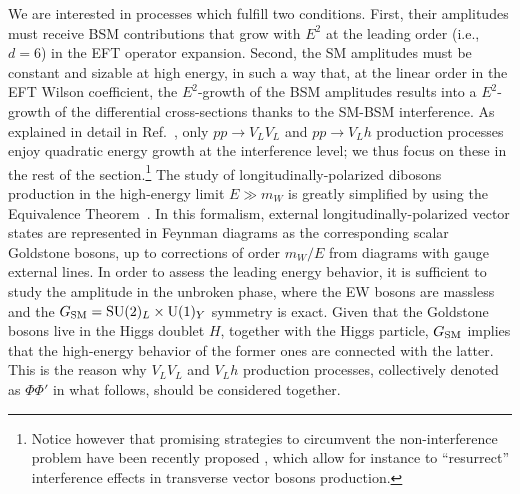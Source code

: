 \documentclass[../report.tex]{subfiles}
\begin{document}
We are interested in processes which fulfill two conditions. First, their amplitudes must receive BSM contributions that grow with $E^2$ at the leading order (i.e., $d=6$) in the EFT operator expansion. Second, the  SM amplitudes must be constant and sizable
at high energy, in such a way that, at the linear order in the EFT Wilson coefficient,  the $E^2$-growth of the BSM amplitudes
results into a $E^2$-growth of the differential cross-sections thanks to the SM-BSM interference. 
As explained in detail in Ref.~\cite{Franceschini:2017ab}, only $pp \to V_LV_L $ and $pp \to V_L h$ production
processes  enjoy quadratic energy growth at the interference level; we thus focus on these in the rest of the
section.\footnote{Notice however that promising strategies to circumvent the non-interference problem have been recently proposed \cite{Panico:2017frx,Azatov:2017kzw}, which allow for instance to ``resurrect'' interference effects in transverse vector bosons production.}
The study of longitudinally-polarized dibosons production in the high-energy limit $E\gg m_{W}$ is greatly simplified
by using the Equivalence Theorem~\cite{Chanowitz:1985hj,Wulzer:2013mza}.
In this formalism, external longitudinally-polarized vector states are represented in Feynman diagrams as the corresponding
scalar Goldstone bosons, up to corrections of order $m_W/E$ from diagrams with gauge external lines.
In order to assess the leading energy behavior, it is sufficient to study the amplitude in the unbroken phase,
where the EW bosons are massless and the $G_{\rm{SM}}={\textrm{SU}}(2)_L\times{\textrm{U}}(1)_Y$ symmetry is exact.
Given that the Goldstone bosons live in the Higgs doublet $H$, together with the Higgs particle, $G_{\rm{SM}}$ implies
that the high-energy behavior of the former ones are connected with the latter. This is the reason why $V_LV_L$
and $V_Lh$ production processes, collectively denoted as $\Phi\Phi'$ in what follows, should be considered together.
\end{document}
